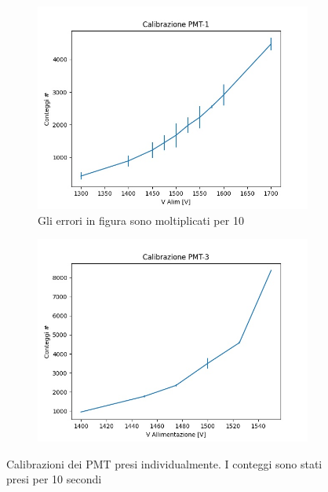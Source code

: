 \documentclass[a4paper]{article}
\begin{document}
\begin{figure}[H]
	\centering
	\begin{subfigure}[b]{0.4\textwidth}
		\centering
		\includegraphics[width=\textwidth]{./immagini/TimeOfFlight/CalSinPMT-1.jpg}
		\caption{Gli errori in figura sono moltiplicati per 10}
		\label{fig:CalSinPMT-1}
	\end{subfigure}
	\hfill
	\begin{subfigure}[b]{0.4\textwidth}
		\centering
		\includegraphics[width=\textwidth]{./immagini/TimeOfFlight/CalSinPMT-3}
		\caption{}
		\label{fig:CalSinPMT-3}
	\end{subfigure}
	\caption{Calibrazioni dei PMT presi individualmente. I conteggi sono stati presi per 10 secondi}
	\label{fig:CalSinPMT}
\end{figure}
\end{document}
